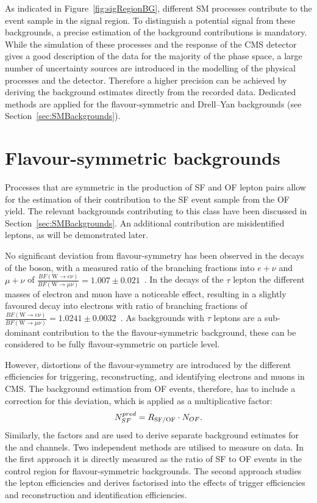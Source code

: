 \label{sec:backgrounds}
As indicated in Figure~\ref{fig:sigRegionBG}, different SM processes contribute to the event sample in the signal region. To distinguish a potential signal from these backgrounds, a precise estimation of the background contributions is mandatory. While the simulation of these processes and the response of the CMS detector gives a good description of the data for the majority of the phase space, a large number of uncertainty sources are introduced in the modelling of the physical processes and the detector. Therefore a higher precision can be achieved by deriving the background estimates directly from the recorded data. Dedicated methods are applied for the flavour-symmetric and Drell--Yan backgrounds (see Section~\ref{sec:SMBackgrounds}).

\section{Flavour-symmetric backgrounds}
Processes that are symmetric in the production of SF and OF lepton pairs allow for the estimation of their contribution to the SF event sample from the OF yield. The relevant backgrounds contributing to this class have been discussed in Section~\ref{sec:SMBackgrounds}. An additional contribution are misidentified leptons, as will be demonstrated later. 

No significant deviation from flavour-symmetry has been observed in the decays of the \W boson, with a measured ratio of the branching fractions into $e+\nu$ and $\mu + \nu$ of $\frac{BF(\text{W}\rightarrow e\nu)}{BF(\text{W}\rightarrow \mu\nu)} = 1.007\pm0.021$~\cite{PDG}. In the decays of the $\tau$ lepton the different masses of electron and muon have a noticeable effect, resulting in a slightly favoured decay into electrons with ratio of branching fractions of  $\frac{BF(\text{W}\rightarrow e\nu)}{BF(\text{W}\rightarrow \mu\nu)} = 1.0241\pm0.0032$~\cite{PDG}. As backgrounds with $\tau$ leptons are a sub-dominant contribution to the the flavour-symmetric background, these can be considered to be fully flavour-symmetric on particle level. 

However, distortions of the flavour-symmetry are introduced by the different efficiencies for triggering, reconstructing, and identifying electrons and muons in CMS. The background estimation from OF events, therefore, has to include a correction for this deviation, which is applied as a multiplicative factor:
\begin{equation}
N_{SF}^{pred} = R_{\text{SF/OF}} \cdot N_{OF}.
\end{equation}
Similarly, the factors \Reeof and \Rmmof are used to derive separate background estimates for the \EE and \MM channels. Two independent methods are utilised to measure \Rsfof on data. In the first approach it is directly measured as the ratio of SF to OF events in the control region for flavour-symmetric backgrounds. The second approach studies the lepton efficiencies and derives \Rsfof factorised into the effects of trigger efficiencies and reconstruction and identification efficiencies.  

